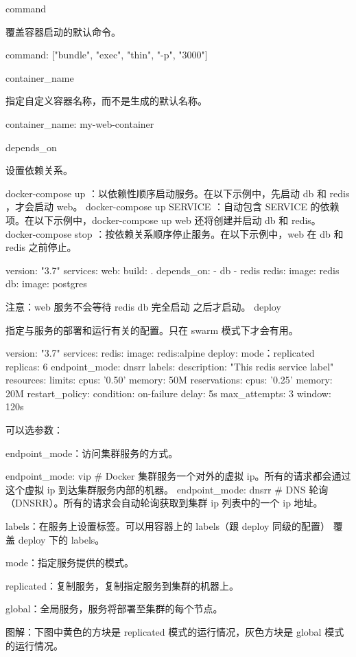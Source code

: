 command

覆盖容器启动的默认命令。

command: ["bundle", "exec", "thin", "-p", "3000"]

container_name

指定自定义容器名称，而不是生成的默认名称。

container_name: my-web-container

depends_on

设置依赖关系。

    docker-compose up ：以依赖性顺序启动服务。在以下示例中，先启动 db 和 redis ，才会启动 web。
    docker-compose up SERVICE ：自动包含 SERVICE 的依赖项。在以下示例中，docker-compose up web 还将创建并启动 db 和 redis。
    docker-compose stop ：按依赖关系顺序停止服务。在以下示例中，web 在 db 和 redis 之前停止。

version: "3.7"
services:
  web:
    build: .
    depends_on:
      - db
      - redis
  redis:
    image: redis
  db:
    image: postgres

注意：web 服务不会等待 redis db 完全启动 之后才启动。
deploy

指定与服务的部署和运行有关的配置。只在 swarm 模式下才会有用。

version: "3.7"
services:
  redis:
    image: redis:alpine
    deploy:
      mode：replicated
      replicas: 6
      endpoint_mode: dnsrr
      labels: 
        description: "This redis service label"
      resources:
        limits:
          cpus: '0.50'
          memory: 50M
        reservations:
          cpus: '0.25'
          memory: 20M
      restart_policy:
        condition: on-failure
        delay: 5s
        max_attempts: 3
        window: 120s

可以选参数：

endpoint_mode：访问集群服务的方式。

endpoint_mode: vip 
# Docker 集群服务一个对外的虚拟 ip。所有的请求都会通过这个虚拟 ip 到达集群服务内部的机器。
endpoint_mode: dnsrr
# DNS 轮询（DNSRR）。所有的请求会自动轮询获取到集群 ip 列表中的一个 ip 地址。

labels：在服务上设置标签。可以用容器上的 labels（跟 deploy 同级的配置） 覆盖 deploy 下的 labels。

mode：指定服务提供的模式。

    replicated：复制服务，复制指定服务到集群的机器上。

    global：全局服务，服务将部署至集群的每个节点。

    图解：下图中黄色的方块是 replicated 模式的运行情况，灰色方块是 global 模式的运行情况。

